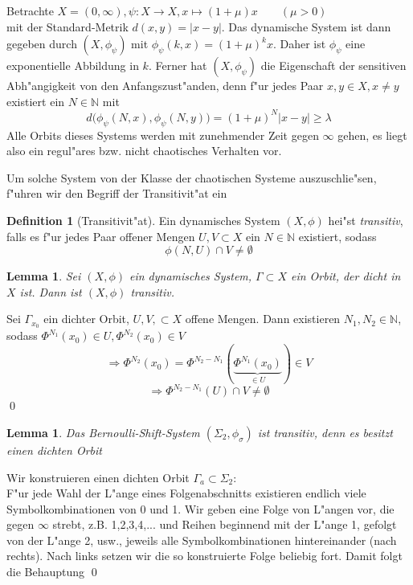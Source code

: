 \documentclass[a4paper, 13pt]{scrreprt}
\newtheorem{lemma}[theorem]{Lemma}
\theoremstyle{definition} \newtheorem{definition}{Definition}[section]
\newenvironment{beweis}[1][Beweis]{\begin{trivlist}
\item[\hskip \labelsep {\bfseries #1}]}{\end{trivlist}}
\newenvironment{beispiel}[1][Beispiel]{\begin{trivlist}
\item[\hskip \labelsep {\bfseries #1}]}{\end{trivlist}}
\begin{document}
\begin{beispiel}
Betrachte \(X = (0,\infty), \psi:X\to X, x\mapsto (1+\mu)x \qquad (\mu>0)\)\\
mit der Standard-Metrik \(d(x,y) = |x-y|\). Das dynamische System ist dann gegeben durch $(X, \phi_\psi)$ mit $\phi_\psi(k, x) = (1+\mu)^k x$. Daher ist $\phi_\psi$ eine exponentielle Abbildung in $k$. Ferner hat \((X,\phi_\psi)\) die Eigenschaft der sensitiven Abh"angigkeit von den Anfangszust"anden, denn f"ur jedes Paar \(x,y\in X, x\neq y\) existiert ein \(N\in\mathbb{N}\) mit
		\[d\bigl(\phi_\psi(N, x),\phi_\psi(N, y)\bigr) = (1+\mu)^N|x-y| \geq \lambda\]
		Alle Orbits dieses Systems werden mit zunehmender Zeit gegen \(\infty\) gehen, es liegt also ein regul"ares bzw. nicht chaotisches Verhalten vor.
\end{beispiel}


Um solche System von der Klasse der chaotischen Systeme auszuschlie"sen, f"uhren wir den Begriff der Transitivit"at ein
\begin{definition}[Transitivit"at]
Ein dynamisches System \((X,\phi)\) hei"st \emph{transitiv}, falls es f"ur jedes Paar offener Mengen \(U,V\subset X\) ein \(N\in\mathbb{N}\) existiert, sodass 
	\[\phi(N, U)\cap V \not= \emptyset\]
\end{definition}

\begin{lemma}
Sei \((X,\phi)\) ein dynamisches System,  \(\Gamma \subset X\) ein Orbit, der dicht in \(X\) ist. Dann ist \((X,\phi)\) transitiv.
\end{lemma}
\begin{beweis}
Sei \(\Gamma_{x_0}\) ein dichter Orbit, \(U,V,\subset X \) offene Mengen. Dann existieren \(N_1, N_2 \in \mathbb{N}\), sodass \(\Phi^{N_1}(x_0) \in U, \Phi^{N_2}(x_0) \in V \) \\
\[\Rightarrow \Phi^{N_2}(x_0) = \Phi^{N_2-N_1}(\underbrace{\Phi^{N_1}(x_0)}_{\in U}) \in V \]
\[\Rightarrow \Phi^{N_2-N_1} (U) \cap V \not= \emptyset \]
\qed
\end{beweis}

\begin{lemma}
Das Bernoulli-Shift-System $(\Sigma_2, \phi_\sigma)$ ist transitiv, denn es besitzt einen dichten Orbit
\end{lemma}
\begin{beweis}
Wir konstruieren einen dichten Orbit \(\Gamma_a \subset \Sigma_2\): \\
F"ur jede Wahl der L"ange eines Folgenabschnitts existieren endlich viele Symbolkombinationen von 0 und 1. Wir geben eine Folge von L"angen vor, die gegen \(\infty\) strebt, z.B. 1,2,3,4,... und Reihen beginnend mit der L"ange 1, gefolgt von der L"ange 2, usw., jeweils alle Symbolkombinationen hintereinander (nach rechts). Nach links setzen wir die so konstruierte Folge beliebig fort. Damit folgt die Behauptung
\qed
\end{beweis}
\end{document}
